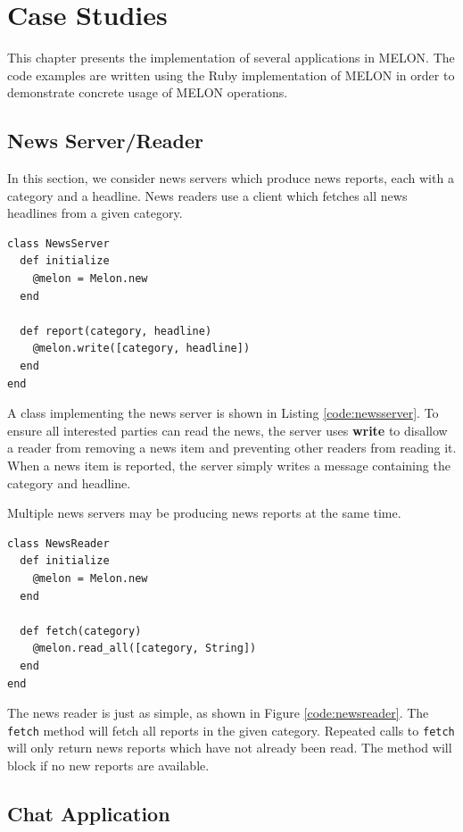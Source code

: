  \chapter{Case Studies}\label{chapter:cases}

This chapter presents the implementation of several applications in MELON. The code examples are written using the Ruby implementation of MELON in order to demonstrate concrete usage of MELON operations.

\section{News Server/Reader}

In this section, we consider news servers which produce news reports, each with a category and a headline. News readers use a client which fetches all news headlines from a given category.

\begin{lstlisting}[caption={News Server}, label={code:newsserver}]
class NewsServer
  def initialize
    @melon = Melon.new
  end

  def report(category, headline)
    @melon.write([category, headline])
  end
end
\end{lstlisting}


A class implementing the news server is shown in Listing \ref{code:newsserver}. To ensure all interested parties can read the news, the server uses \textbf{write} to disallow a reader from removing a news item and preventing other readers from reading it. When a news item is reported, the server simply writes a message containing the category and headline.

Multiple news servers may be producing news reports at the same time.

\begin{lstlisting}[caption={News Reader}, label={code:newsreader}]
class NewsReader
  def initialize
    @melon = Melon.new
  end

  def fetch(category)
    @melon.read_all([category, String])
  end
end
\end{lstlisting}

The news reader is just as simple, as shown in Figure \ref{code:newsreader}. The \texttt{fetch} method will fetch all reports in the given category. Repeated calls to \texttt{fetch} will only return news reports which have not already been read. The method will block if no new reports are available.

\section{Chat Application}

